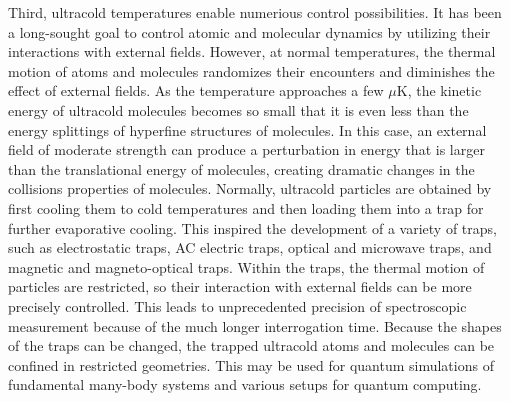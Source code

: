 Third, ultracold temperatures enable numerious control possibilities. It has been a long-sought goal to control atomic and 
molecular dynamics by utilizing their interactions with external fields. However, at normal temperatures, the thermal 
motion of atoms and molecules randomizes their encounters and diminishes the effect of external fields. As the temperature
approaches a few $\mu$K, the kinetic energy of ultracold molecules becomes so small  that it is even less than 
the energy splittings of hyperfine structures of molecules. In this case, an external field of moderate strength can produce a perturbation
in energy that is larger than the translational energy of molecules, creating dramatic changes in the collisions properties of
molecules\cite{krems2005}. Normally, ultracold particles are obtained by first cooling them to cold temperatures and then loading them into a trap for further evaporative cooling\cite{metcalf1999}. 
This inspired the development of a variety of 
traps, such as electrostatic traps\cite{bethlem2000}, AC electric traps\cite{vanVeldhoven2005}, optical and microwave
traps\cite{optical-lattice-review, deMille2004}, and magnetic and magneto-optical traps\cite{hogan2008, 
vanhaecke2002, wang2004}. Within the traps, the thermal motion of particles are restricted, so their
interaction with external fields can be more precisely controlled. This leads to unprecedented precision of 
spectroscopic measurement because of the much longer  interrogation time\cite{vandeMeerakker2005, 
gilijamse2007, campbell2008}. Because the shapes of the traps can be changed, the trapped ultracold atoms and 
molecules can be confined in restricted geometries. This may be used for quantum simulations of 
fundamental many-body systems\cite{Baranov2012} and various setups for quantum computing\cite{brennen1999,
jaksch1999, pachos2003, kay2004, micheli2006, buchler2007a, bloch2008}.  


